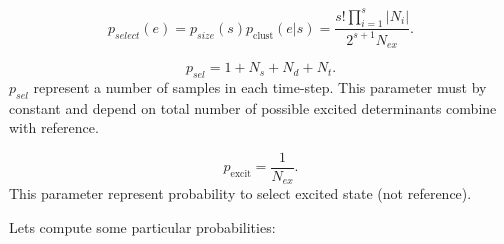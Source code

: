 \documentclass[twoside,english]{uiofysmaster}
\theoremstyle{definition}
\begin{document}
\begin{equation}
p_{select}(e)= p_{size}(s) p_{\text{clust}} (e|s) =  \frac{s!\prod_{i=1}^{s} |N_i|}{2^{s+1}N_{ex}}.
\end{equation}



\begin{equation}
p_{sel}= 1+N_{s}+N_{d}+N_{t}.
\end{equation}
$p_{sel}$ represent a number of samples in each time-step. This parameter must by constant and depend on total number of possible excited determinants combine with reference.


\begin{equation}
p_{\text{excit}} = \frac{1}{N_{ex}}.
\end{equation}
This parameter represent probability to select excited state (not reference).





Lets compute some particular probabilities:\\
\end{document}
